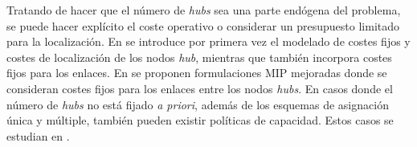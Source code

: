 Tratando de hacer que el número de \emph{hubs} sea una parte endógena del problema, se puede hacer explícito el coste operativo o considerar un presupuesto limitado para la localización. En \cite{o1992hub} se introduce por primera vez  el modelado de costes fijos y costes de localización de los nodos \emph{hub}, mientras que \cite{campbell1994integer} también incorpora costes fijos para los enlaces. En \cite{sohn1998efficient} se proponen formulaciones MIP mejoradas donde se consideran costes fijos para los enlaces entre los nodos \emph{hubs}.
En casos donde el número de \emph{hubs} no está fijado \emph{a priori}, además de los esquemas de
asignación única y múltiple, también pueden existir políticas de capacidad. Estos
casos se estudian en 
\cite{campbell1994integer,aykin1994lagrangian,labbe2005branch, yaman2005solving,marin2005formulating}.
